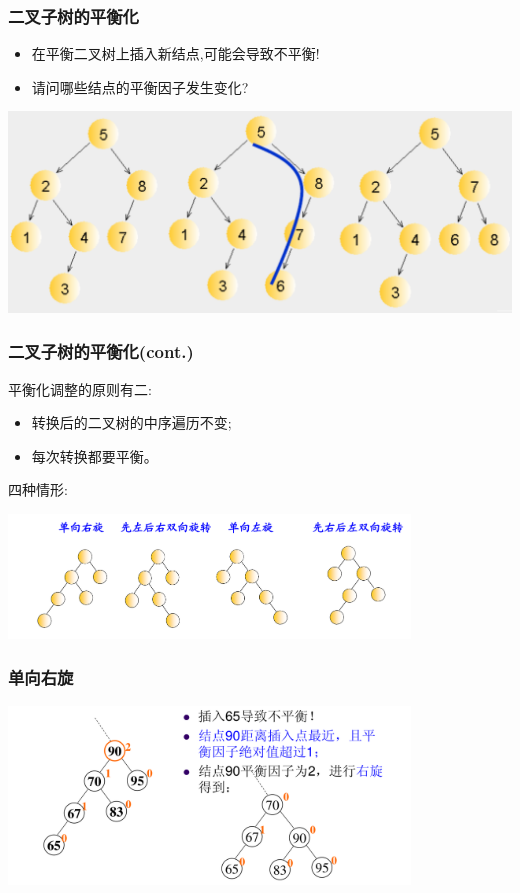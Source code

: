 \begin{frame}[fragile]
  \frametitle{二叉子树的平衡化}
  \begin{itemize}
  \item 在平衡二叉树上插入新结点,可能会导致不平衡!
  \item 请问哪些结点的平衡因子发生变化?
  \end{itemize}

  \includegraphics[width=1.0\textwidth]{figs/AVL-1.png}
\end{frame}

\begin{frame}[fragile]
  \frametitle{二叉子树的平衡化(cont.)}
  平衡化调整的原则有二:
  \begin{itemize}
  \item 转换后的二叉树的中序遍历不变;
  \item 每次转换都要平衡。
  \end{itemize}

  四种情形:

  \includegraphics[width=0.8\textwidth]{figs/AVL-2.png}
\end{frame}

\begin{frame}[fragile]
  \frametitle{单向右旋}
  \includegraphics[width=0.8\textwidth]{figs/AVL-4.png}
\end{frame}


